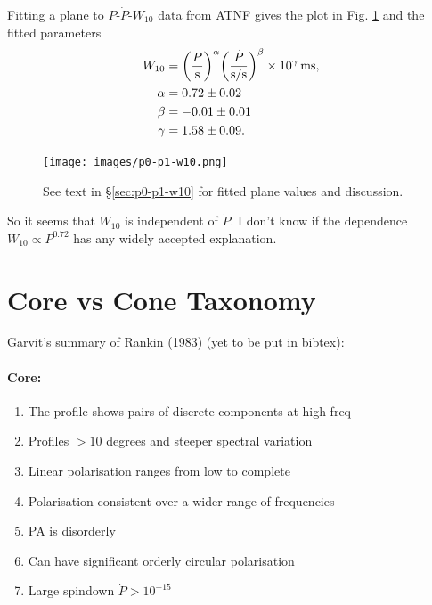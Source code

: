 \documentclass{book}
\begin{document}
Fitting a plane to $P$-$\dot{P}$-$W_{10}$ data from ATNF gives the plot in Fig. \ref{fig:p0-p1-w10} and the fitted parameters
\begin{equation}
  \begin{aligned}
    W_{10} &= \bigg(\frac{P}{\rm s}\bigg)^\alpha \bigg(\frac{\dot{P}}{\rm s/s}\bigg)^\beta \times 10^\gamma\,{\rm ms}, \\
    \alpha &= 0.72 \pm 0.02 \\
    \beta &= -0.01 \pm 0.01 \\
    \gamma &= 1.58 \pm 0.09.
  \end{aligned}
\end{equation}
\begin{figure}[th]
    \centering
    \texttt{[image: images/p0-p1-w10.png]}
    \caption{See text in \S\ref{sec:p0-p1-w10} for fitted plane values and discussion.}
    \label{fig:p0-p1-w10}
\end{figure}
So it seems that $W_{10}$ is independent of $\dot{P}$.
I don't know if the dependence $W_{10} \propto P^{0.72}$ has any widely accepted explanation.

\section{Core vs Cone Taxonomy}

Garvit's summary of Rankin (1983) (yet to be put in bibtex):

\paragraph{Core:}
\begin{enumerate}
    \item The profile shows pairs of discrete components at high freq
    \item Profiles $>10$ degrees and steeper spectral variation
    \item Linear polarisation ranges from low to complete
    \item Polarisation consistent over a wider range of frequencies
    \item PA is disorderly
    \item Can have significant orderly circular polarisation
    \item Large spindown $\dot{P} > 10^{-15}$
\end{enumerate}
\end{document}
